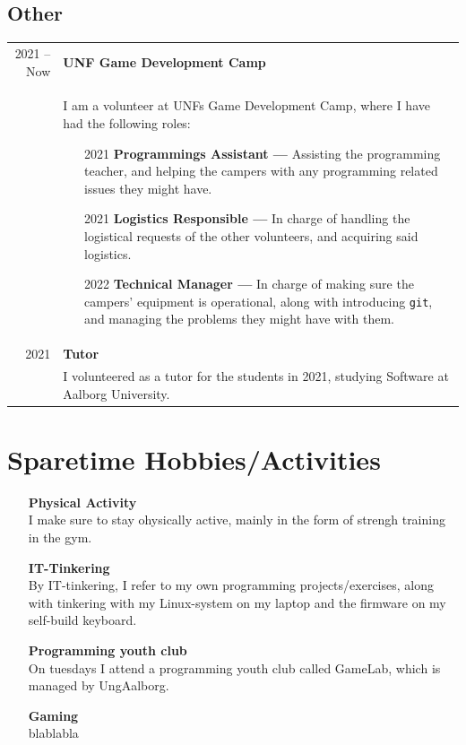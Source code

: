 \documentclass{article}
\begin{document}
    \subsection*{Other}
    \begin{tabular}{r|p{.82\linewidth}}
        2021 -- Now & \textbf{UNF Game Development Camp}\\
    &   I am a volunteer at UNFs Game Development Camp, where I have had the following roles:
        \begin{itemize}\setlength\itemsep{0em}
            \item[2021] \textbf{Programmings Assistant ---} Assisting the programming teacher, and
                helping the campers with any programming related issues they might have.
            \item[2021] \textbf{Logistics Responsible ---} In charge of handling the logistical
                requests of the other volunteers, and acquiring said logistics.
            \item[2022] \textbf{Technical Manager ---} In charge of making sure the campers'
                equipment is operational, along with introducing \verb|git|, and managing the
                problems they might have with them.
        \end{itemize}
        \\
        2021 & \textbf{Tutor}\\
    &   I volunteered as a tutor for the students in 2021, studying Software at Aalborg University. 
    \end{tabular}

    \section*{Sparetime Hobbies/Activities}
    \begin{itemize}\setlength\itemsep{0.5em}
        \item[] \textbf{Physical Activity}\\
            I make sure to stay ohysically active, mainly in the form of strengh training in the
            gym.
        \item[] \textbf{IT-Tinkering}\\
            By IT-tinkering, I refer to my own programming projects/exercises, along with tinkering
            with my Linux-system on my laptop and the firmware on my self-build keyboard.
        \item[] \textbf{Programming youth club}\\
            On tuesdays I attend a programming youth club called GameLab, which is managed by
            UngAalborg.
        \item[] \textbf{Gaming}\\
            blablabla %
    \end{itemize}
\end{document}
